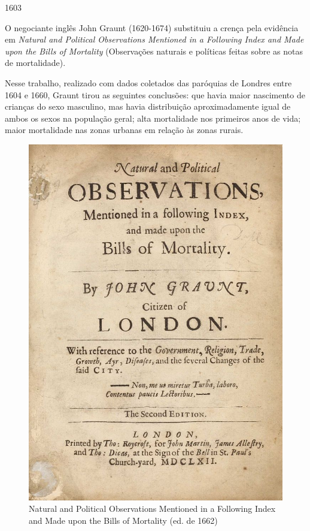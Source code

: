 \documentclass[
]{book}
\begin{document}
\hfill\break

1603

\hfill\break

O negociante inglês John Graunt (1620-1674) substituiu a crença pela evidência em \emph{Natural and Political Observations Mentioned in a Following Index and Made upon the Bills of Mortality} (Observações naturais e políticas feitas sobre as notas de mortalidade).

Nesse trabalho, realizado com dados coletados das paróquias de Londres entre 1604 e 1660, Graunt tirou as seguintes conclusões: que havia maior nascimento de crianças do sexo masculino, mas havia distribuição aproximadamente igual de ambos os sexos na população geral; alta mortalidade nos primeiros anos de vida; maior mortalidade nas zonas urbanas em relação às zonas rurais.

\hfill\break

\begin{figure}

{\centering \includegraphics[width=0.75\linewidth]{images1/graunt} 

}

\caption{Natural and Political Observations Mentioned in a Following Index and Made upon the Bills of Mortality (ed. de 1662)}\label{fig:unnamed-chunk-4}
\end{figure}
\end{document}
